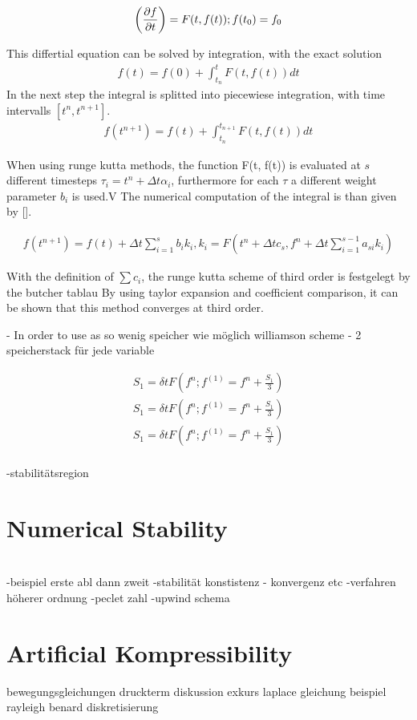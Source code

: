 \begin{align}
    \left(\pdn[f]{t}\right) = F(t, f(t)) ; f(t_0) = f_0
\end{align}

This differtial equation can be solved by integration, with the exact solution
\begin{align}
    f(t) = f(0) + \int_{t_n}^{t}F(t, f(t))dt
\end{align}
In the next step the integral is splitted into piecewiese integration, with time intervalls $[t^n, t^{n+1}]$.
\begin{align}
    f(t^{n+1}) = f(t) + \int_{t_n}^{t_{n+1}}F(t, f(t))dt
\end{align}

When using runge kutta methods, the function F(t, f(t)) is evaluated at $s$ different timesteps $\tau_i = t^n + \Delta t \alpha_i$,
furthermore for each $\tau$ a different weight parameter $b_i$ is used.V
The numerical computation of the integral is than given by [].

\begin{align}
    f(t^{n+1}) = f(t) + \Delta t \sum_{i=1}^s b_i k_i, k_i = F(t^n + \Delta t c_s, f^n + \Delta t \sum_{i=1}^{s-1}a_{si}k_i)
\end{align}

With the definition of $\sum c_i$, the runge kutta scheme of third order is festgelegt by the butcher tablau
By using taylor expansion and coefficient comparison, it can be shown that this  method converges at third order.


- In order to use as  so wenig speicher wie möglich williamson scheme
- 2 speicherstack für jede variable

\begin{align}
    S_1 = \delta t F(f^n ; f^(1) = f^n + \frac{S_1}{3}) \\
    S_1 = \delta t F(f^n ; f^(1) = f^n + \frac{S_1}{3}) \\
    S_1 = \delta t F(f^n ; f^(1) = f^n + \frac{S_1}{3}) \\
\end{align}


-stabilitätsregion

\section{Numerical Stability}\mbox{}\\

-beispiel erste abl dann zweit
-stabilität konstistenz - konvergenz etc
-verfahren höherer ordnung
-peclet zahl
-upwind schema



\newpage

\section{Artificial Kompressibility}
bewegungsgleichungen
druckterm diskussion
exkurs laplace gleichung
beispiel rayleigh benard diskretisierung

